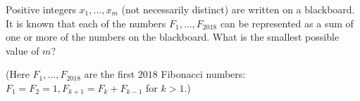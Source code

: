 Positive integers $x_1,...,x_m$ (not necessarily distinct) are written on a blackboard. It is known that each of the numbers $F_1,...,F_{2018}$ can be represented as a sum of one or more of the numbers on the blackboard. What is the smallest possible value of $m$?

(Here $F_1,...,F_{2018}$ are the first $2018$ Fibonacci numbers: $F_1=F_2=1, F_{k+1}=F_k+F_{k-1}$ for $k>1$.)